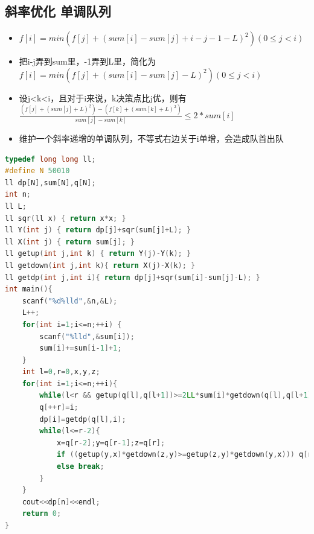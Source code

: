 \documentclass[UTF8,a4paper,titlepage]{ctexart}
\begin{document}
    \subsection{斜率优化 单调队列}
\begin{itemize}
		\item $f[i]=min(f[j]+(sum[i]-sum[j]+i-j-1-L)^2) (0\le j<i)$	
		\item 把i-j弄到sum里，-1弄到L里，简化为$f[i]=min(f[j]+(sum[i]-sum[j]-L)^2) (0\le j<i)$	
		\item 设j<k<i，且对于i来说，k决策点比j优，则有$\frac{(f[j]+(sum[j]+L)^2)-(f[k]+(sum[k]+L)^2)}{sum[j]-sum[k]} \le 2*sum[i]$
		\item 维护一个斜率递增的单调队列，不等式右边关于i单增，会造成队首出队
\end{itemize}
      \begin{lstlisting}[language=C++]
typedef long long ll;
#define N 50010
ll dp[N],sum[N],q[N];
int n;
ll L;
ll sqr(ll x) { return x*x; }
ll Y(int j) { return dp[j]+sqr(sum[j]+L); }
ll X(int j) { return sum[j]; }
ll getup(int j,int k) { return Y(j)-Y(k); }
ll getdown(int j,int k){ return X(j)-X(k); }
ll getdp(int j,int i){ return dp[j]+sqr(sum[i]-sum[j]-L); }
int main(){
    scanf("%d%lld",&n,&L);
    L++;
    for(int i=1;i<=n;++i) {
        scanf("%lld",&sum[i]);
        sum[i]+=sum[i-1]+1;
    }
    int l=0,r=0,x,y,z;
    for(int i=1;i<=n;++i){
        while(l<r && getup(q[l],q[l+1])>=2LL*sum[i]*getdown(q[l],q[l+1])) l++;
        q[++r]=i;
        dp[i]=getdp(q[l],i);
        while(l<=r-2){
            x=q[r-2];y=q[r-1];z=q[r];
            if ((getup(y,x)*getdown(z,y)>=getup(z,y)*getdown(y,x))) q[r-1]=q[r],--r;
            else break;
        }
    }
    cout<<dp[n]<<endl;
    return 0;
}

      \end{lstlisting}
\end{document}
